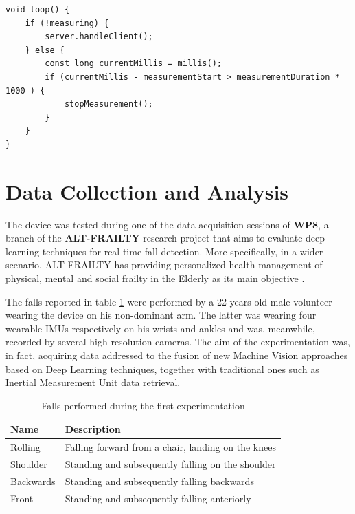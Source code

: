 \begin{verbatim}
void loop() {
    if (!measuring) {
        server.handleClient();
    } else {
        const long currentMillis = millis();
        if (currentMillis - measurementStart > measurementDuration * 1000 ) {
            stopMeasurement();
        }
    }
}
\end{verbatim}

\pagebreak

\section{Data Collection and Analysis}\label{sec:data-collection}


The device was tested during one of the data acquisition sessions of \textbf{WP8}, a branch of the \textbf{ALT-FRAILTY} research project that aims to evaluate deep learning techniques for real-time fall detection. More specifically, in a wider scenario, ALT-FRAILTY has providing personalized health management of physical, mental and social frailty in the Elderly as its main objective \cite{altfrailty}.

The falls reported in table \ref{toc:bitalino-falls} were performed by a 22 years old male volunteer wearing the device on his non-dominant arm. The latter was wearing four wearable IMUs respectively on his wrists and ankles and was, meanwhile, recorded by several high-resolution cameras. The aim of the experimentation was, in fact, acquiring data addressed to the fusion of new Machine Vision approaches based on Deep Learning techniques, together with traditional ones such as Inertial Measurement Unit data retrieval.

\vspace{7mm}

\begin{table}[H]
\centering
\begin{tabular}{ll}
    \hline
    Name            &  Description           \\
    \hline
    Rolling         & Falling forward from a chair, landing on the knees \\
    Shoulder        & Standing and subsequently falling on the shoulder \\
    Backwards       & Standing and subsequently falling backwards \\
    Front           & Standing and subsequently falling anteriorly \\
    \hline
\end{tabular}
\caption{Falls performed during the first experimentation}
\label{toc:bitalino-falls}
\end{table}

